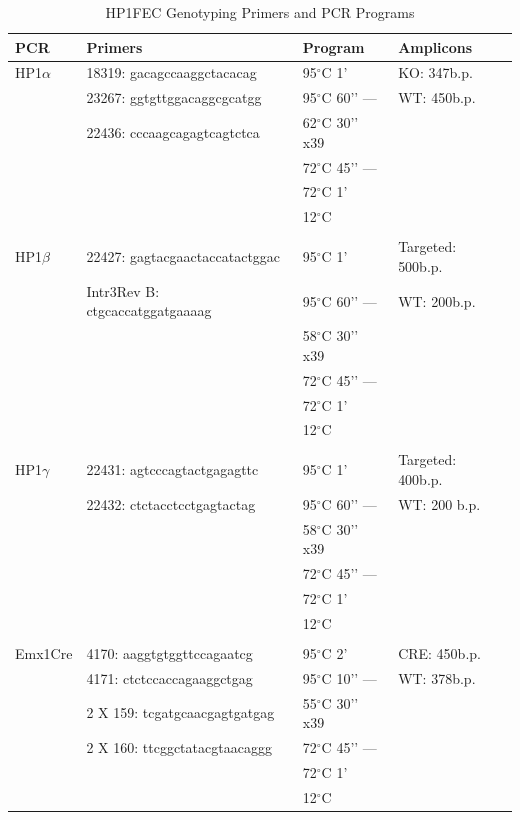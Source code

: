 \documentclass[onehalf,12pt]{beavtex}
\begin{document}
  \begin{table}[t]
  
  \caption{\label{tab:GenotypingPCRs}HP1FEC Genotyping Primers and PCR Programs}
  \centering
  \begin{tabular}{llll}
  \toprule
  PCR & Primers & Program & Amplicons\\
  \midrule
  HP1$\alpha$ & 18319: gacagccaaggctacacag & 95$^\circ$C 1’ & KO: 347b.p.\\
   & 23267: ggtgttggacaggcgcatgg & 95$^\circ$C 60’’ --- & WT: 450b.p.\\
   & 22436: cccaagcagagtcagtctca & 62$^\circ$C 30’’ x39 & \\
   &  & 72$^\circ$C 45’’ --- & \\
   &  & 72$^\circ$C 1’ & \\
  \addlinespace
   &  & 12$^\circ$C & \\
   &  &  & \\
  HP1$\beta$ & 22427: gagtacgaactaccatactggac & 95$^\circ$C 1’ & Targeted: 500b.p.\\
   & Intr3Rev B: ctgcaccatggatgaaaag & 95$^\circ$C 60’’  --- & WT: 200b.p.\\
   &  & 58$^\circ$C 30’’   x39 & \\
  \addlinespace
   &  & 72$^\circ$C 45’’  --- & \\
   &  & 72$^\circ$C 1’ & \\
   &  & 12$^\circ$C & \\
   &  &  & \\
  HP1$\gamma$ & 22431: agtcccagtactgagagttc & 95$^\circ$C 1’ & Targeted: 400b.p.\\
  \addlinespace
   & 22432: ctctacctcctgagtactag & 95$^\circ$C 60’’  --- & WT: 200 b.p.\\
   &  & 58$^\circ$C 30’’   x39 & \\
   &  & 72$^\circ$C 45’’  --- & \\
   &  & 72$^\circ$C 1’ & \\
   &  & 12$^\circ$C & \\
  \addlinespace
   &  &  & \\
  Emx1Cre & 4170: aaggtgtggttccagaatcg & 95$^\circ$C 2’ & CRE: 450b.p.\\
   & 4171: ctctccaccagaaggctgag & 95$^\circ$C 10’’  --- & WT: 378b.p.\\
   & 2 X 159: tcgatgcaacgagtgatgag & 55$^\circ$C 30’’   x39 & \\
   & 2 X 160: ttcggctatacgtaacaggg & 72$^\circ$C 45’’  --- & \\
  \addlinespace
   &  & 72$^\circ$C 1’ & \\
   &  & 12$^\circ$C & \\
  \bottomrule
  \end{tabular}
  \end{table}
  
\end{document}
